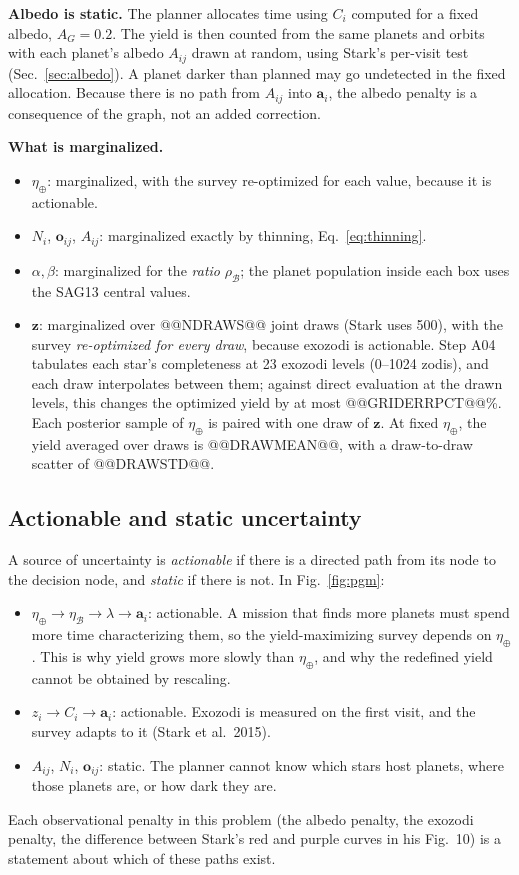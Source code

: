 \documentclass[11pt,a4paper]{article}
\begin{document}
\textbf{Albedo is static.} The planner allocates time using $C_i$ computed for a fixed albedo,
$A_G = 0.2$. The yield is then counted from the same planets and orbits with each planet's albedo
$A_{ij}$ drawn at random, using Stark's per-visit test (Sec.~\ref{sec:albedo}). A planet darker
than planned may go undetected in the fixed allocation. Because there is no path from $A_{ij}$
into $\mathbf{a}_i$, the albedo penalty is a consequence of the graph, not an added correction.

\textbf{What is marginalized.}
\begin{itemize}
\item $\eta_\oplus$: marginalized, with the survey re-optimized for each value, because it is
actionable.
\item $N_i$, $\mathbf{o}_{ij}$, $A_{ij}$: marginalized exactly by thinning,
Eq.~\eqref{eq:thinning}.
\item $\alpha, \beta$: marginalized for the \emph{ratio} $\rho_\mathcal{B}$; the planet population
inside each box uses the SAG13 central values.
\item $\mathbf{z}$: marginalized over @@NDRAWS@@ joint draws (Stark uses 500), with the survey
\emph{re-optimized for every draw}, because exozodi is actionable. Step A04 tabulates each star's
completeness at 23 exozodi levels (0--1024 zodis), and each draw interpolates between them; against
direct evaluation at the drawn levels, this changes the optimized yield by at most
@@GRIDERRPCT@@\%. Each posterior sample of $\eta_\oplus$ is paired with one draw of $\mathbf{z}$.
At fixed $\eta_\oplus$, the yield averaged over draws is @@DRAWMEAN@@, with a draw-to-draw scatter
of @@DRAWSTD@@.
\end{itemize}

\subsection{Actionable and static uncertainty}

A source of uncertainty is \emph{actionable} if there is a directed path from its node to the
decision node, and \emph{static} if there is not. In Fig.~\ref{fig:pgm}:
\begin{itemize}
\item $\eta_\oplus \to \eta_\mathcal{B} \to \lambda \to \mathbf{a}_i$: actionable. A mission that
finds more planets must spend more time characterizing them, so the yield-maximizing survey depends
on $\eta_\oplus$. This is why yield grows more slowly than $\eta_\oplus$, and why the redefined
yield cannot be obtained by rescaling.
\item $z_i \to C_i \to \mathbf{a}_i$: actionable. Exozodi is measured on the first visit, and the
survey adapts to it (Stark et al.\ 2015).
\item $A_{ij}$, $N_i$, $\mathbf{o}_{ij}$: static. The planner cannot know which stars host
planets, where those planets are, or how dark they are.
\end{itemize}
Each observational penalty in this problem (the albedo penalty, the exozodi penalty, the difference
between Stark's red and purple curves in his Fig.~10) is a statement about which of these paths
exist.
\end{document}
